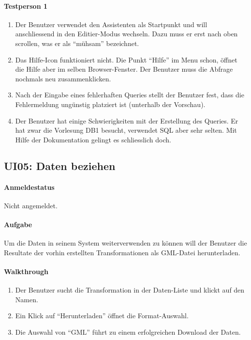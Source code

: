 \paragraph{Testperson 1}
\begin{enumerate}
\item Der Benutzer verwendet den Assistenten als Startpunkt und will anschliessend in den Editier-Modus wechseln. Dazu muss er erst nach oben scrollen, was er als ``mühsam'' bezeichnet.
\item Das Hilfe-Icon funktioniert nicht. Die Punkt ``Hilfe'' im Menu schon, öffnet die Hilfe aber im selben Browser-Fenster. Der Benutzer muss die Abfrage nochmals neu zusammenklicken.
\item Nach der Eingabe eines fehlerhaften Queries stellt der Benutzer fest, dass die Fehlermeldung ungünstig platziert ist (unterhalb der Vorschau).
\item Der Benutzer hat einige Schwierigkeiten mit der Erstellung des Queries. Er hat zwar die Vorlesung DB1 besucht, verwendet SQL aber sehr selten. Mit Hilfe der Dokumentation gelingt es schliesslich doch.
\end{enumerate}

\subsection{UI05: Daten beziehen}
\paragraph{Anmeldestatus} Nicht angemeldet.
\paragraph{Aufgabe} Um die Daten in seinem System weiterverwenden zu können will der Benutzer die Resultate der vorhin erstellten Transformationen als GML-Datei herunterladen.

\paragraph{Walkthrough}
\begin{enumerate}
\item Der Benutzer sucht die Transformation in der Daten-Liste und klickt auf den Namen.
\item Ein Klick auf ``Herunterladen'' öffnet die Format-Auswahl.
\item Die Auswahl von ``GML'' führt zu einem erfolgreichen Download der Daten.
\end{enumerate}

